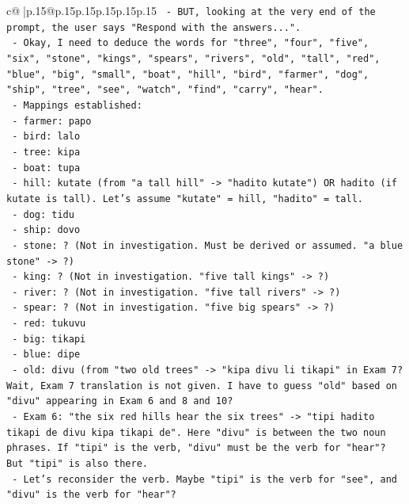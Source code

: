 \documentclass{article}
\begin{document}
{\begin{supertabular}{c@{$\;$}|p{.15\linewidth}@{}p{.15\linewidth}p{.15\linewidth}p{.15\linewidth}p{.15\linewidth}p{.15\linewidth}}
{{{\texttt{      {-} BUT, looking at the very end of the prompt, the user says "Respond with the answers...".} \\
\texttt{      {-} Okay, I need to deduce the words for "three", "four", "five", "six", "stone", "kings", "spears", "rivers", "old", "tall", "red", "blue", "big", "small", "boat", "hill", "bird", "farmer", "dog", "ship", "tree", "see", "watch", "find", "carry", "hear".} \\
\texttt{      {-} Mappings established:} \\
\texttt{        {-} farmer: papo} \\
\texttt{        {-} bird: lalo} \\
\texttt{        {-} tree: kipa} \\
\texttt{        {-} boat: tupa} \\
\texttt{        {-} hill: kutate (from "a tall hill" {-}> "hadito kutate") OR hadito (if kutate is tall). Let's assume "kutate" = hill, "hadito" = tall.} \\
\texttt{        {-} dog: tidu} \\
\texttt{        {-} ship: dovo} \\
\texttt{        {-} stone: ? (Not in investigation. Must be derived or assumed. "a blue stone" {-}> ?)} \\
\texttt{        {-} king: ? (Not in investigation. "five tall kings" {-}> ?)} \\
\texttt{        {-} river: ? (Not in investigation. "five tall rivers" {-}> ?)} \\
\texttt{        {-} spear: ? (Not in investigation. "five big spears" {-}> ?)} \\
\texttt{        {-} red: tukuvu} \\
\texttt{        {-} big: tikapi} \\
\texttt{        {-} blue: dipe} \\
\texttt{        {-} old: divu (from "two old trees" {-}> "kipa divu li tikapi" in Exam 7? Wait, Exam 7 translation is not given. I have to guess "old" based on "divu" appearing in Exam 6 and 8 and 10?} \\
\texttt{          {-} Exam 6: "the six red hills hear the six trees" {-}> "tipi hadito tikapi de divu kipa tikapi de". Here "divu" is between the two noun phrases. If "tipi" is the verb, "divu" must be the verb for "hear"? But "tipi" is also there.} \\
\texttt{          {-} Let's reconsider the verb. Maybe "tipi" is the verb for "see", and "divu" is the verb for "hear"?} \\
}}}
\end{supertabular}}
\end{document}
